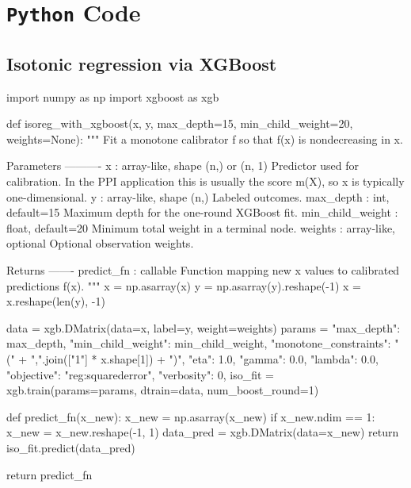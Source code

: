 \documentclass{article}
\theoremstyle{plain}
\theoremstyle{definition}
\newcommand{\1}{\mathbbm{1}}
\begin{document}
\section{\texttt{Python} Code}
\label{appendix:code}

\subsection{Isotonic regression via XGBoost}
\begin{codeblock}
import numpy as np
import xgboost as xgb

def isoreg_with_xgboost(x, y, max_depth=15, min_child_weight=20, weights=None):
    """
    Fit a monotone calibrator f so that f(x) is nondecreasing in x.

    Parameters
    ----------
    x : array-like, shape (n,) or (n, 1)
        Predictor used for calibration. In the PPI application this is usually
        the score m(X), so x is typically one-dimensional.
    y : array-like, shape (n,)
        Labeled outcomes.
    max_depth : int, default=15
        Maximum depth for the one-round XGBoost fit.
    min_child_weight : float, default=20
        Minimum total weight in a terminal node.
    weights : array-like, optional
        Optional observation weights.

    Returns
    -------
    predict_fn : callable
        Function mapping new x values to calibrated predictions f(x).
    """
    x = np.asarray(x)
    y = np.asarray(y).reshape(-1)
    x = x.reshape(len(y), -1)

    data = xgb.DMatrix(data=x, label=y, weight=weights)
    params = {
        "max_depth": max_depth,
        "min_child_weight": min_child_weight,
        "monotone_constraints": "(" + ",".join(["1"] * x.shape[1]) + ")",
        "eta": 1.0,
        "gamma": 0.0,
        "lambda": 0.0,
        "objective": "reg:squarederror",
        "verbosity": 0,
    }
    iso_fit = xgb.train(params=params, dtrain=data, num_boost_round=1)

    def predict_fn(x_new):
        x_new = np.asarray(x_new)
        if x_new.ndim == 1:
            x_new = x_new.reshape(-1, 1)
        data_pred = xgb.DMatrix(data=x_new)
        return iso_fit.predict(data_pred)

    return predict_fn
\end{codeblock}
\end{document}

